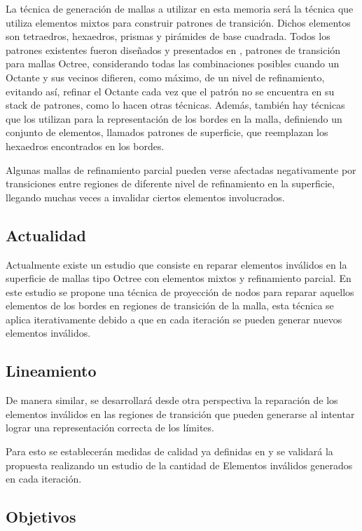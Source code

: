 La técnica de generación de mallas a utilizar en esta memoria será la técnica que utiliza elementos mixtos para construir patrones de transición.
Dichos elementos son tetraedros, hexaedros, prismas y pirámides de base cuadrada. Todos los patrones existentes fueron diseñados y presentados en \cite{Gonzalez2014}, patrones de transición para mallas Octree, considerando todas las combinaciones posibles cuando un Octante y sus vecinos difieren, como máximo, de un nivel de refinamiento, evitando así, refinar el Octante cada vez que el patrón no se encuentra en su stack de patrones, como lo hacen otras técnicas. Además, también hay técnicas que los utilizan para la representación de los bordes en la malla, definiendo un conjunto de elementos, llamados patrones de superficie, que reemplazan los hexaedros encontrados en los bordes.

Algunas mallas de refinamiento parcial pueden verse afectadas negativamente por transiciones entre regiones de diferente nivel de refinamiento en la superficie, llegando muchas veces a invalidar ciertos elementos involucrados. 

\subsection{Actualidad}

Actualmente existe un estudio \cite{daines2018repairing} que consiste en reparar elementos inválidos en la superficie de mallas tipo Octree con elementos mixtos y refinamiento parcial. En este estudio se propone una técnica de proyección de nodos para reparar aquellos elementos de los bordes en regiones de transición de la malla, esta técnica se aplica iterativamente debido a que en cada iteración se pueden generar nuevos elementos inválidos.

\subsection{Lineamiento}

De manera similar, se desarrollará desde otra perspectiva la reparación de los elementos inválidos en las regiones de transición que pueden generarse al intentar lograr una representación correcta de los límites.

Para esto se establecerán medidas de calidad ya definidas en  \cite{daines2018repairing} y se validará la propuesta realizando un estudio de la cantidad de Elementos inválidos generados en cada iteración.

\subsection{Objetivos}
